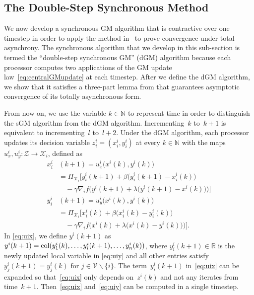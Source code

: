 \documentclass[9pt,shortpaper,twoside,web]{ieeecolor}
\newcommand{\X}{\ensuremath{\mathcal{X}}\xspace}
\newcommand{\Z}{\ensuremath{\mathcal{Z}}\xspace}
\newcommand{\V}{\ensuremath{\mathcal{V}}\xspace}
\newcommand{\col}[2]{\textnormal{col}(#1,#2)}
\begin{document}
\subsection{The Double-Step Synchronous Method}
We now develop a synchronous GM algorithm that is contractive over one timestep in order to 
apply the method in~\cite{bertsekas1989parallel} to prove convergence under total asynchrony. 
The synchronous algorithm that we develop in this sub-section is termed the ``double-step synchronous GM'' (dGM) algorithm
because each processor computes two applications of the GM update law~\eqref{eq:centralGMupdate} at each timestep.
After we define the dGM algorithm, we show that it satisfies a three-part lemma from \cite{bertsekas1989parallel} 
that guarantees asymptotic convergence of its totally asynchronous form.

From now on, we use the variable $k\in\mathbb N$ to represent time in order to
distinguish the sGM algorithm from the dGM algorithm.
Incrementing~$k$ to~$k+1$ is equivalent to incrementing~$l$ to~$l+2$. 
Under the dGM algorithm, each processor updates its decision variable $z^i_i=(x^i_i,y^i_i)$ at every $k\in\mathbb{N}$ with the maps $u^i_x,u^i_y:\Z\rightarrow \X_i$, defined as
\begin{align}
    x^i_i&(k+1) = u^i_x\big(x^i(k),y^i(k)\big) \label{eq:uix}
    \\ &= \Pi_{\X_i}\Big[ y^i_i(k+1)+ \beta\big(y^i_i(k+1)-x^i_i(k)\big)
    \\&\quad-\gamma\nabla_i f\Big( y^i(k+1) 
    + \lambda\big(y^i(k+1)-x^i(k)\big)\Big) \Big]
   \\ y^i_i&(k+1) = u^i_y\big(x^i(k),y^i(k)\big)\label{eq:uiy}
   \\ &= \Pi_{\X_i}\Big[ x^i_i(k) + \beta\big(x^i_i(k)-y^i_i(k)\big)
   \\&\quad - \gamma\nabla_i f\Big( x^i(k)+ \lambda\big(x^i(k)-y^i(k)\big)\Big)\Big].
\end{align}
In \eqref{eq:uix}, we define $y^i(k+1)$ as $y^i(k+1)=\col{y^i_1(k),\dots,y^i_i(k+1),\dots}{y^i_n(k)}$, where $y^i_i(k+1) \in \mathbb{R}$ is the newly updated local variable in \eqref{eq:uiy} and all other entries satisfy~$y^i_j(k+1) = y^i_j(k)$ 
for $j \in \V\backslash\{i\}$.
The term~$y^i_i(k+1)$ in~\eqref{eq:uix} can be expanded so that~\eqref{eq:uix}
only depends on~$z^i(k)$ and not any iterates from time~$k+1$. 
Then~\eqref{eq:uix} and~\eqref{eq:uiy} can be computed in a single timestep.
\end{document}
